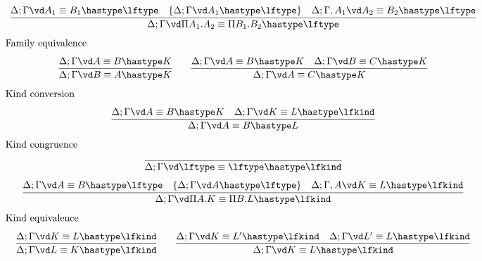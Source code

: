 \documentclass[copyright,creativecommons]{eptcs}
\makeatletter
\newcommand{\abox}[1]{\multicolumn 1 {@{}p{\textwidth}@{}} {#1}}
\makeatother
\begin{document}
{\[\begin{array}{c}
\infer{\Delta; \Gamma \vd \Pi A_1. A_2 \equiv \Pi B_1. B_2 \hastype \lftype}{
       \Delta; \Gamma \vd A_1 \equiv B_1 \hastype \lftype & 
       \{\Delta; \Gamma \vd A_1 \hastype \lftype\} & 
       \Delta; \Gamma, A_1 \vd A_2 \equiv B_2 \hastype \lftype}
\\[0.75em]
\abox{Family equivalence}\\[0.75em]
\infer{\Delta; \Gamma \vd B \equiv A \hastype K}{
  \Delta; \Gamma \vd A \equiv B \hastype K} 
\hspace{2em}
\infer{\Delta; \Gamma \vd A \equiv C \hastype K}{
  \Delta; \Gamma \vd A \equiv B \hastype K & \Delta; \Gamma \vd B \equiv C \hastype K}
\\[0.75em]
\abox{Kind conversion}\\[0.75em]
\infer{\Delta; \Gamma \vd A \equiv B \hastype L}{
  \Delta; \Gamma \vd A \equiv B \hastype K & 
  \Delta; \Gamma \vd K \equiv L \hastype \lfkind}
\\[0.75em]
\abox{Kind congruence\hspace{12cm}}\\[0.75em]
\infer{\Delta; \Gamma \vd \lftype \equiv \lftype \hastype \lfkind}{}
\\[0.75em]
\infer{\Delta; \Gamma \vd \Pi A. K \equiv \Pi B. L \hastype \lfkind}{
       \Delta; \Gamma \vd A \equiv B \hastype \lftype & 
       \{\Delta; \Gamma \vd A \hastype \lftype\} & 
       \Delta; \Gamma, A \vd K \equiv L \hastype \lfkind}
\\[0.75em]
\abox{Kind equivalence}\\[0.75em]
\infer{\Delta; \Gamma \vd L \equiv K \hastype \lfkind}{
  \Delta; \Gamma \vd K \equiv L \hastype \lfkind} 
\hspace{2em}
\infer{\Delta; \Gamma \vd K \equiv L \hastype \lfkind}{
  \Delta; \Gamma \vd K \equiv L' \hastype \lfkind & 
  \Delta; \Gamma \vd L' \equiv L \hastype \lfkind} 
\end{array}
\] 
} 
\end{document}
